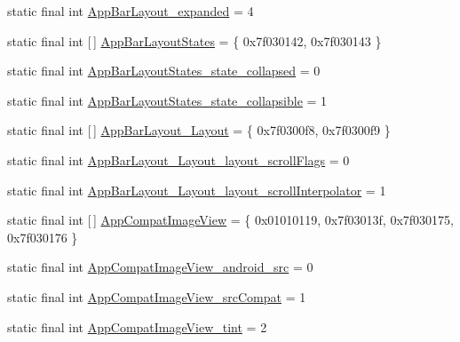 \begin{DoxyCompactItemize}
\item 
static final int \mbox{\hyperlink{classandroid_1_1support_1_1design_1_1R_1_1styleable_a965848a88c548e64fa7f537bd7cc68fc}{App\+Bar\+Layout\+\_\+expanded}} = 4
\item 
static final int \mbox{[}$\,$\mbox{]} \mbox{\hyperlink{classandroid_1_1support_1_1design_1_1R_1_1styleable_a74f59a98e1a6b60a9b0105b06a7c47de}{App\+Bar\+Layout\+States}} = \{ 0x7f030142, 0x7f030143 \}
\item 
static final int \mbox{\hyperlink{classandroid_1_1support_1_1design_1_1R_1_1styleable_aad3006313ce2fa9348c295671857aa6a}{App\+Bar\+Layout\+States\+\_\+state\+\_\+collapsed}} = 0
\item 
static final int \mbox{\hyperlink{classandroid_1_1support_1_1design_1_1R_1_1styleable_a38f559cb609d2a15dc5286c608e44af3}{App\+Bar\+Layout\+States\+\_\+state\+\_\+collapsible}} = 1
\item 
static final int \mbox{[}$\,$\mbox{]} \mbox{\hyperlink{classandroid_1_1support_1_1design_1_1R_1_1styleable_a2ae24fbf6ad959261eae1d48e6785f26}{App\+Bar\+Layout\+\_\+\+Layout}} = \{ 0x7f0300f8, 0x7f0300f9 \}
\item 
static final int \mbox{\hyperlink{classandroid_1_1support_1_1design_1_1R_1_1styleable_ae17e2fff1ab1fa2e76d54bffcbc0b7a1}{App\+Bar\+Layout\+\_\+\+Layout\+\_\+layout\+\_\+scroll\+Flags}} = 0
\item 
static final int \mbox{\hyperlink{classandroid_1_1support_1_1design_1_1R_1_1styleable_a8def336188967609892f562546f9fab6}{App\+Bar\+Layout\+\_\+\+Layout\+\_\+layout\+\_\+scroll\+Interpolator}} = 1
\item 
static final int \mbox{[}$\,$\mbox{]} \mbox{\hyperlink{classandroid_1_1support_1_1design_1_1R_1_1styleable_ada1b5e4475936c9e01181fdb4d8cb6c9}{App\+Compat\+Image\+View}} = \{ 0x01010119, 0x7f03013f, 0x7f030175, 0x7f030176 \}
\item 
static final int \mbox{\hyperlink{classandroid_1_1support_1_1design_1_1R_1_1styleable_a91574d14dc3fe2fd351bdb829d2c1c7e}{App\+Compat\+Image\+View\+\_\+android\+\_\+src}} = 0
\item 
static final int \mbox{\hyperlink{classandroid_1_1support_1_1design_1_1R_1_1styleable_a401c665da120b8a6fccd1aeda1d932d9}{App\+Compat\+Image\+View\+\_\+src\+Compat}} = 1
\item 
static final int \mbox{\hyperlink{classandroid_1_1support_1_1design_1_1R_1_1styleable_a3f458aca9a85cdb5775e2497efc58a36}{App\+Compat\+Image\+View\+\_\+tint}} = 2
\item 

\end{DoxyCompactItemize}
